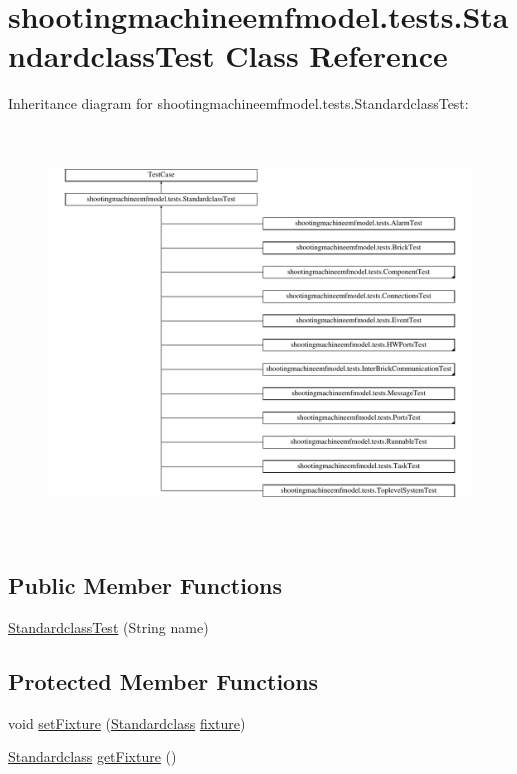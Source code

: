 \hypertarget{classshootingmachineemfmodel_1_1tests_1_1_standardclass_test}{\section{shootingmachineemfmodel.\-tests.\-Standardclass\-Test Class Reference}
\label{classshootingmachineemfmodel_1_1tests_1_1_standardclass_test}
}
Inheritance diagram for shootingmachineemfmodel.\-tests.\-Standardclass\-Test\-:\begin{figure}[H]
\begin{center}
\leavevmode
\includegraphics[height=10.828730cm]{classshootingmachineemfmodel_1_1tests_1_1_standardclass_test}
\end{center}
\end{figure}
\subsection*{Public Member Functions}
\begin{DoxyCompactItemize}
\item 
\hyperlink{classshootingmachineemfmodel_1_1tests_1_1_standardclass_test_a0d09f609e98665c66fbee78f217ff5c5}{Standardclass\-Test} (String name)
\end{DoxyCompactItemize}
\subsection*{Protected Member Functions}
\begin{DoxyCompactItemize}
\item 
void \hyperlink{classshootingmachineemfmodel_1_1tests_1_1_standardclass_test_a39478f09a19bc07bf1ecb7e073348250}{set\-Fixture} (\hyperlink{interfaceshootingmachineemfmodel_1_1_standardclass}{Standardclass} \hyperlink{classshootingmachineemfmodel_1_1tests_1_1_standardclass_test_a24066ba25427e61a0110fc63c2707f24}{fixture})
\item 
\hyperlink{interfaceshootingmachineemfmodel_1_1_standardclass}{Standardclass} \hyperlink{classshootingmachineemfmodel_1_1tests_1_1_standardclass_test_a3f0db0a01016ee257c9214ff335e0b07}{get\-Fixture} ()
\end{DoxyCompactItemize}
